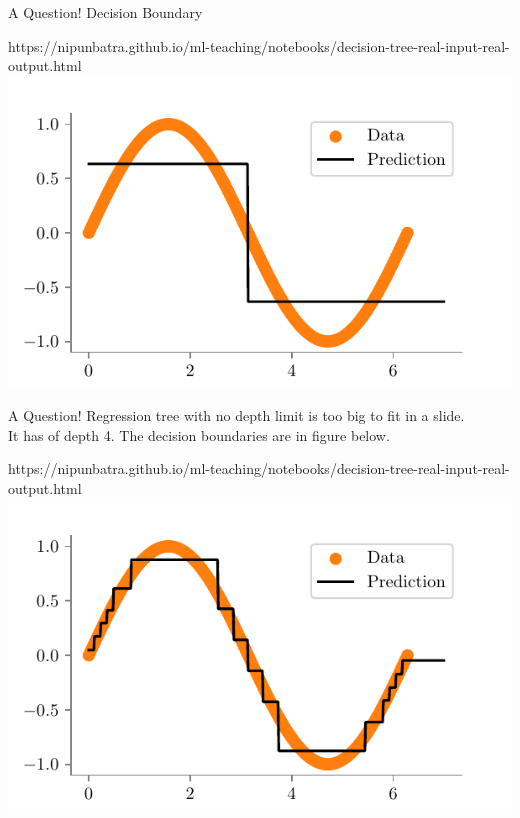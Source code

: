 \documentclass[usenames,dvipsnames]{beamer}
\begin{document}
\begin{frame}{A Question!}
Decision Boundary
\begin{center}
	\begin{notebookbox}{https://nipunbatra.github.io/ml-teaching/notebooks/decision-tree-real-input-real-output.html}
		\includegraphics{../assets/decision-trees/figures/sine-depth-1.pdf}
	  \end{notebookbox}
\end{center}
\end{frame}

\begin{frame}{A Question!}
Regression tree with no depth limit is too big to fit in a slide. \\
It has of depth 4. The decision boundaries are in figure below.\\
\begin{center}
	\begin{notebookbox}{https://nipunbatra.github.io/ml-teaching/notebooks/decision-tree-real-input-real-output.html}
		\includegraphics{../assets/decision-trees/figures/sine-depth-4.pdf}
	  \end{notebookbox}
\end{center}
\end{frame}
\end{document}
